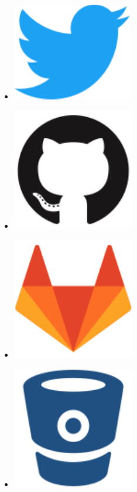 \documentclass[a4paper,oneside,11pt]{article}
\begin{document}
\begin{multicols}{9}
\begin{itemize}
\item[]\href{https://twitter.com/metimdjai}{\includegraphics[scale=0.2]{assets/twitter-original.pdf}}

\item[]\href{https://github.com/iosang}{\includegraphics[scale=0.2]{assets/github-original.pdf}}

\item[]\href{https://gitlab.com/metimdjai}{\includegraphics[scale=0.2]{assets/gitlab-original.pdf}}

\item[]\href{https://bitbucket.org/Metimdjai/}{\includegraphics[scale=0.2]{assets/bitbucket-original.pdf}}


\end{itemize}
\end{multicols}
\end{document}
